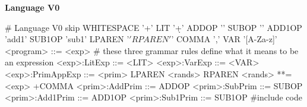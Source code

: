 \begin{minipage}[t]{\sw}
\slidenumber
\LARGE
{\bf Language V0}
\Large
\begin{qv}
# Language V0
skip WHITESPACE '\s+'
LIT '\d+'
ADDOP '\+'
SUBOP '\-'
ADD1OP 'add1'
SUB1OP 'sub1'
LPAREN '\('
RPAREN '\)'
COMMA ','
VAR '[A-Za-z]\w*'
%
<program>        ::= <exp>
# these three grammar rules define what it means to be an expression
<exp>:LitExp     ::= <LIT>
<exp>:VarExp     ::= <VAR>
<exp>:PrimAppExp ::= <prim> LPAREN <rands> RPAREN
<rands>          **= <exp> +COMMA
<prim>:AddPrim   ::= ADDOP
<prim>:SubPrim   ::= SUBOP
<prim>:Add1Prim  ::= ADD1OP
<prim>:Sub1Prim  ::= SUB1OP
%
#include code
\end{qv}
\end{minipage}
\clearpage
